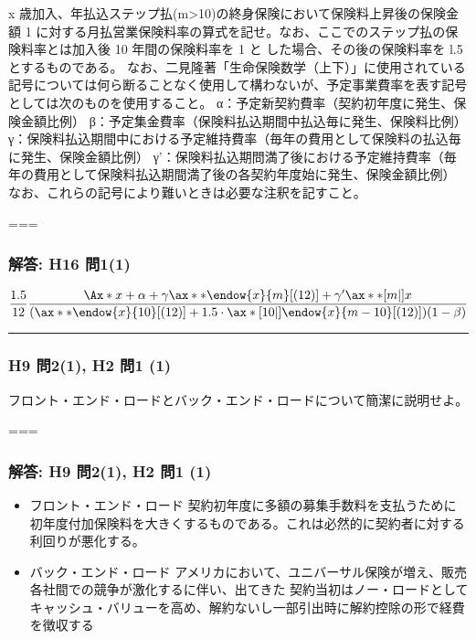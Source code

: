 \documentclass[]{article}
\begin{document}
x
歳加入、年払込ステップ払(m\textgreater10)の終身保険において保険料上昇後の保険金額
1
に対する月払営業保険料率の算式を記せ。なお、ここでのステップ払の保険料率とは加入後
10 年間の保険料率を 1 と した場合、その後の保険料率を l.5
とするものである。
なお、二見隆著「生命保険数学（上下）」に使用されている記号については何ら断ることなく使用して構わないが、予定事業費率を表す記号としては次のものを使用すること。
α：予定新契約費率（契約初年度に発生、保険金額比例）
β：予定集金費率（保険料払込期間中払込毎に発生、保険料比例）
γ：保険料払込期間中における予定維持費率（毎年の費用として保険料の払込毎に発生、保険金額比例）
γ'：保険料払込期問満了後における予定維持費率（毎年の費用として保険料払込期間満了後の各契約年度始に発生、保険金額比例）
なお、これらの記号により難いときは必要な注釈を記すこと。

===

\hypertarget{ux89e3ux7b54-h16-ux554f11}{%
\subsubsection{解答: H16 問1(1)}\label{ux89e3ux7b54-h16-ux554f11}}

\[
\frac{1.5}{12}
\frac{\Ax*{x}+\alpha+\gamma \ax**{\endow{x}{m}}[(12)]+\gamma' \ax**[m|]{x}}{(\ax**{\endow{x}{10}}[(12)]+1.5\cdot\ax*[10|]{\endow{x}{m-10}}[(12)])(1-\beta)}
\]

\begin{center}\rule{0.5\linewidth}{0.5pt}\end{center}

\hypertarget{h9-ux554f21-h2-ux554f1-1}{%
\subsubsection{H9 問2(1), H2 問1 (1)}\label{h9-ux554f21-h2-ux554f1-1}}

フロント・エンド・ロードとバック・エンド・ロードについて簡潔に説明せよ。

===

\hypertarget{ux89e3ux7b54-h9-ux554f21-h2-ux554f1-1}{%
\subsubsection{解答: H9 問2(1), H2 問1
(1)}\label{ux89e3ux7b54-h9-ux554f21-h2-ux554f1-1}}

\begin{itemize}
\tightlist
\item
  フロント・エンド・ロード
  契約初年度に多額の募集手数料を支払うために初年度付加保険料を大きくするものである。これは必然的に契約者に対する利回りが悪化する。\\
\item
  バック・エンド・ロード
  アメリカにおいて、ユニバーサル保険が増え、販売各社間での競争が激化するに伴い、出てきた
  契約当初はノー・ロードとしてキャッシュ・バリューを高め、解約ないし一部引出時に解約控除の形で経費を徴収する
\end{itemize}
\end{document}
